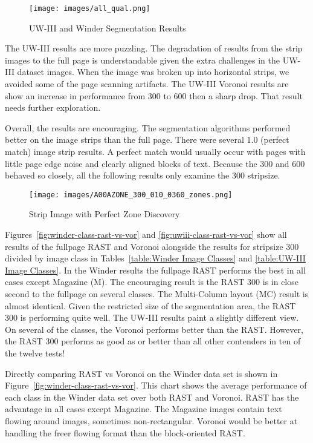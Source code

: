\documentclass[conference]{IEEEtran}
\begin{document}
\begin{figure}[all-qualitative]
\begin{center}
\caption{UW-III and Winder Segmentation Results}
\label{fig:all-qualitative}
  \texttt{[image: images/all\_qual.png]}
\end{center}
\end{figure}

The UW-III results are more puzzling. The degradation of results from the
strip images to the full page is understandable given the extra challenges in
the UW-III dataset images. When the image was broken up into horizontal strips,
we avoided some of the page scanning artifacts. The UW-III Voronoi results are
show an increase in performance from 300 to 600 then a sharp drop. That result
needs further exploration.

Overall, the results are encouraging. The segmentation algorithms performed
better on the image strips than the full page. There were several 1.0 (perfect
match) image strip results. A perfect match would usually occur with
pages with little page edge noise and clearly aligned blocks of text. Because
the 300 and 600 behaved so closely, all the following results only examine the
300 stripsize. 

\begin{figure}[strip-image-showing-perfect-hit]
\caption{Strip Image with Perfect Zone Discovery}
\label{fig:strip-image-showing-perfect-hit}
\texttt{[image: images/A00AZONE\_300\_010\_0360\_zones.png]}
\end{figure}

Figures~\ref{fig:winder-class-rast-vs-vor} and \ref{fig:uwiii-class-rast-vs-vor} show all results of 
the fullpage RAST and Voronoi alongside the results
for stripsize 300 divided by image class in Tables~\ref{table:Winder Image Classes} 
and \ref{table:UW-III Image Classes}. In the Winder results the fullpage RAST performs the best in
all cases except Magazine (M). The encouraging result is the RAST 300 is in
close second to the fullpage on several classes. The Multi-Column layout (MC)
result is almost identical. Given the restricted size of the segmentation area,
the RAST 300 is performing quite well. The UW-III results paint a slightly
different view. On several of the classes, the Voronoi performs better than the
RAST. However, the RAST 300 performs as good as or better than all other
contenders in ten of the twelve tests!

Directly comparing RAST vs Voronoi on the Winder data set is shown in
Figure~\ref{fig:winder-class-rast-vs-vor}. This chart shows the average
performance of each class in the Winder data set over both RAST and Voronoi.
RAST has the advantage in all cases except Magazine. The Magazine images
contain text flowing around images, sometimes non-rectangular. Voronoi would be
better at handling the freer flowing format than the block-oriented RAST.
\end{document}
